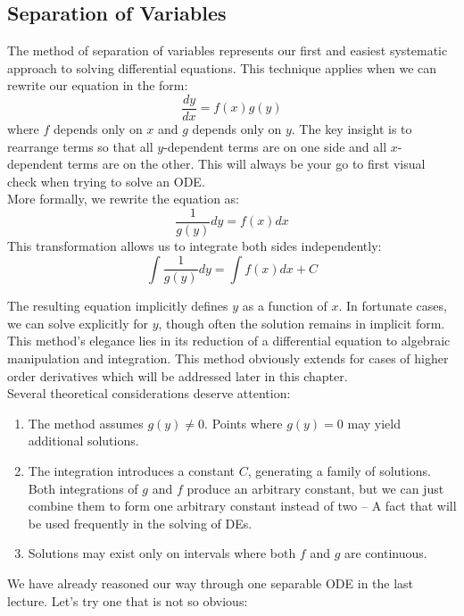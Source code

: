 \subsection*{Separation of Variables} 

\noindent The method of separation of variables represents our first and easiest systematic approach to solving differential equations. This technique applies when we can rewrite our equation in the form:
\[
\frac{dy}{dx} = f(x)g(y)
\]
where $f$ depends only on $x$ and $g$ depends only on $y$. The key insight is to rearrange terms so that all $y$-dependent terms are on one side and all $x$-dependent terms are on the other. This will always be your go to first visual check when trying to solve an ODE.\\

\noindent More formally, we rewrite the equation as:
\[
\frac{1}{g(y)}dy = f(x)dx
\]
This transformation allows us to integrate both sides independently:
\[
\int \frac{1}{g(y)}dy = \int f(x)dx + C
\]

\noindent The resulting equation implicitly defines $y$ as a function of $x$. In fortunate cases, we can solve explicitly for $y$, though often the solution remains in implicit form. This method's elegance lies in its reduction of a differential equation to algebraic manipulation and integration. This method obviously extends for cases of higher order derivatives which will be addressed later in this chapter.\\

\noindent Several theoretical considerations deserve attention:
\begin{enumerate}
    \item The method assumes $g(y) \neq 0$. Points where $g(y) = 0$ may yield additional solutions.
    \item The integration introduces a constant $C$, generating a family of solutions. Both integrations of $g$ and $f$ produce an arbitrary constant, but we can just combine them to form one arbitrary constant instead of two -- A fact that will be used frequently in the solving of DEs.
    \item Solutions may exist only on intervals where both $f$ and $g$ are continuous.
\end{enumerate}

\noindent We have already reasoned our way through one separable ODE in the last lecture. Let's try one that is not so obvious:

